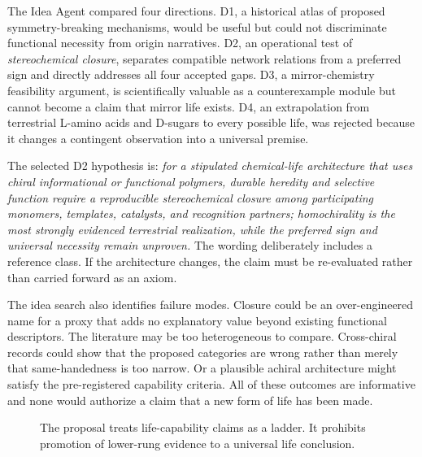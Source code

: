 \documentclass[conference]{IEEEtran}
\newcommand{\closure}{\textit{stereochemical closure}}
\begin{document}
The Idea Agent compared four directions. D1, a historical atlas of proposed symmetry-breaking mechanisms, would be useful but could not discriminate functional necessity from origin narratives. D2, an operational test of \closure, separates compatible network relations from a preferred sign and directly addresses all four accepted gaps. D3, a mirror-chemistry feasibility argument, is scientifically valuable as a counterexample module but cannot become a claim that mirror life exists. D4, an extrapolation from terrestrial L-amino acids and D-sugars to every possible life, was rejected because it changes a contingent observation into a universal premise.

The selected D2 hypothesis is: \emph{for a stipulated chemical-life architecture that uses chiral informational or functional polymers, durable heredity and selective function require a reproducible stereochemical closure among participating monomers, templates, catalysts, and recognition partners; homochirality is the most strongly evidenced terrestrial realization, while the preferred sign and universal necessity remain unproven.} The wording deliberately includes a reference class. If the architecture changes, the claim must be re-evaluated rather than carried forward as an axiom.

The idea search also identifies failure modes. Closure could be an over-engineered name for a proxy that adds no explanatory value beyond existing functional descriptors. The literature may be too heterogeneous to compare. Cross-chiral records could show that the proposed categories are wrong rather than merely that same-handedness is too narrow. Or a plausible achiral architecture might satisfy the pre-registered capability criteria. All of these outcomes are informative and none would authorize a claim that a new form of life has been made.

\begin{figure}[!t]
\centering
{}
\caption{The proposal treats life-capability claims as a ladder. It prohibits promotion of lower-rung evidence to a universal life conclusion.}
\label{fig:ladder}
\end{figure}
\end{document}
